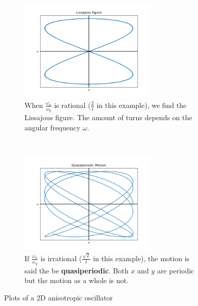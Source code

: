 \begin{figure}[h]
    \centering
    \begin{subfigure}[t]{0.4\textwidth}
        \centering
        \includegraphics[width=6.5cm]{Classical_Mechanics/2.11-2d-osc/Osc2D_wx2wy.png}
        \caption{When $\frac{\omega_x}{\omega_y}$ is rational ($\frac{2}{1}$ in this example), we find the Lissajous figure. The amount of turns depends on the angular frequency $\omega$.}
    \end{subfigure}
    ~ 
    \begin{subfigure}[t]{0.4\textwidth}
        \centering
        \includegraphics[width=6.5cm]{Classical_Mechanics/2.11-2d-osc/Osc2D_quasi.png}
        \caption{If $\frac{\omega_x}{\omega_y}$ is irrational ($\frac{\sqrt{2}}{1}$ in this example), the motion is said the be {\bfseries quasiperiodic}. Both $x$ and $y$ are periodic but the motion as a whole is not.}
    \end{subfigure}
    \caption{Plots of a 2D anisotropic oscillator}
    \label{fig:Osc2D_anisotropic}
\end{figure}
